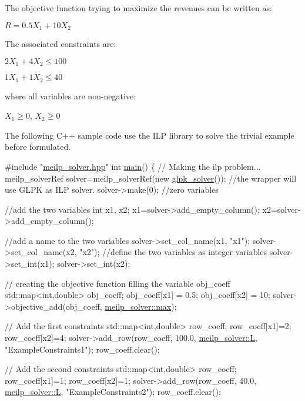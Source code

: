 The objective function trying to maximize the revenues can be written as\+:

$ R = 0.5 X_1 + 10 X_2 $

The associated constraints are\+:

$ 2 X_1 + 4 X_2 \le 100 $

$ 1 X_1 + 1 X_2 \le 40 $

where all variables are non-\/negative\+:

$ X_1 \ge 0 $, $ X_2 \ge 0 $

The following C++ sample code use the I\+LP library to solve the trivial example before formulated. 
\begin{DoxyCode}
\textcolor{preprocessor}{#include "\hyperlink{meilp__solver_8hpp}{meilp\_solver.hpp}"}
\textcolor{keywordtype}{int} \hyperlink{test__degree__coloring_8cpp_a0ddf1224851353fc92bfbff6f499fa97}{main}()
\{
  \textcolor{comment}{// Making the ilp problem...}
  meilp\_solverRef solver=meilp\_solverRef(\textcolor{keyword}{new} \hyperlink{classglpk__solver}{glpk\_solver}()); \textcolor{comment}{//the wrapper will use GLPK as ILP
       solver.}
  solver->make(0); \textcolor{comment}{//zero variables}

  \textcolor{comment}{//add the two variables}
  \textcolor{keywordtype}{int} x1, x2;
  x1=solver->add\_empty\_column();
  x2=solver->add\_empty\_column();

  \textcolor{comment}{//add a name to the two variables}
  solver->set\_col\_name(x1,  \textcolor{stringliteral}{"x1"});
  solver->set\_col\_name(x2,  \textcolor{stringliteral}{"x2"});
  \textcolor{comment}{//define the two variables as integer variables}
  solver->set\_int(x1);
  solver->set\_int(x2);

  \textcolor{comment}{// creating the objective function filling the variable obj\_coeff}
  std::map<int,double> obj\_coeff;
  obj\_coeff[x1] = 0.5;
  obj\_coeff[x2] = 10;
  solver->objective\_add(obj\_coeff, \hyperlink{classmeilp__solver_a2f719db6577d73007d942af7e6fe907caae8b9d75adb582264515691d95a5cb57}{meilp\_solver::max});

  \textcolor{comment}{// Add the first constraints}
  std::map<int,double> row\_coeff;
  row\_coeff[x1]=2;
  row\_coeff[x2]=4;
  solver->add\_row(row\_coeff, 100.0, \hyperlink{classmeilp__solver_a2cb689f3c242a34eb05cff99704a3e8eaa6e291b624f90483a42ee037a1d9c84b}{meilp\_solver::L}, \textcolor{stringliteral}{"ExampleConstraints1"});
  row\_coeff.clear();

  \textcolor{comment}{// Add the second constraints}
  std::map<int,double> row\_coeff;
  row\_coeff[x1]=1;
  row\_coeff[x2]=1;
  solver->add\_row(row\_coeff, 40.0, \hyperlink{classmeilp__solver_a2cb689f3c242a34eb05cff99704a3e8eaa6e291b624f90483a42ee037a1d9c84b}{meilp\_solver::L}, \textcolor{stringliteral}{"ExampleConstraints2"});
  row\_coeff.clear();


\end{DoxyCode}
